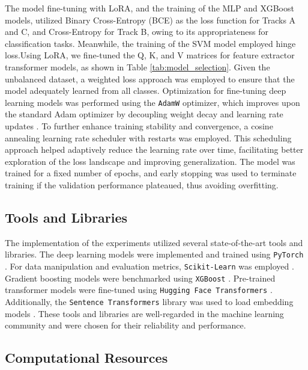 The model fine-tuning with LoRA, and the training of the MLP and XGBoost models, utilized Binary Cross-Entropy (BCE) as the loss function for Tracks A and C, and Cross-Entropy for Track B, owing to its appropriateness for classification tasks. Meanwhile, the training of the SVM model employed hinge loss.Using LoRA, we fine-tuned the Q, K, and V matrices for feature extractor transformer models, as shown in Table \ref{tab:model_selection}. Given the unbalanced dataset, a weighted loss approach was employed to ensure that the model adequately learned from all classes. Optimization for fine-tuning deep learning models was performed using the \texttt{AdamW} optimizer, which improves upon the standard Adam optimizer by decoupling weight decay and learning rate updates \citep{Loshchilov2019AdamW}. To further enhance training stability and convergence, a cosine annealing learning rate scheduler with restarts\cite{loshchilov2017sgdrstochasticgradientdescent} was employed. This scheduling approach helped adaptively reduce the learning rate over time, facilitating better exploration of the loss landscape and improving generalization. The model was trained for a fixed number of epochs, and early stopping was used to terminate training if the validation performance plateaued, thus avoiding overfitting.


\subsection{Tools and Libraries}

The implementation of the experiments utilized several state-of-the-art tools and libraries. The deep learning models were implemented and trained using \texttt{PyTorch} \citep{Paszke2019PyTorch}. For data manipulation and evaluation metrics, \texttt{Scikit-Learn} was employed \citep{Pedregosa2011ScikitLearn}. Gradient boosting models were benchmarked using \texttt{XGBoost} \citep{chen2016xgboost}. Pre-trained transformer models were fine-tuned using \texttt{Hugging Face Transformers} \citep{Wolf2019HuggingFace}. Additionally, the \texttt{Sentence Transformers} library was used to load embedding models \cite{reimers-2019-sentence-bert}\cite{reimers-2020-multilingual-sentence-bert}. These tools and libraries are well-regarded in the machine learning community and were chosen for their reliability and performance.

\subsection{Computational Resources}

